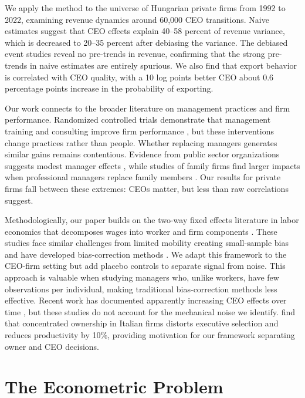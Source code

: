 \documentclass[11pt,a4paper]{article}
\begin{document}
We apply the method to the universe of Hungarian private firms from 1992 to 2022, examining revenue dynamics around 60,000 CEO transitions. Naive estimates suggest that CEO effects explain 40--58 percent of revenue variance, which is decreased to 20--35 percent after debiasing the variance. The debiased event studies reveal no pre-trends in revenue, confirming that the strong pre-trends in naive estimates are entirely spurious. We also find that export behavior is correlated with CEO quality, with a 10 log points better CEO about 0.6 percentage points increase in the probability of exporting.

Our work connects to the broader literature on management practices and firm performance. Randomized controlled trials demonstrate that management training and consulting improve firm performance \citep{bloom2013does, mckenzie2021small}, but these interventions change practices rather than people. Whether replacing managers generates similar gains remains contentious. Evidence from public sector organizations suggests modest manager effects \citep{fenizia2022managers, janke2024role}, while studies of family firms find larger impacts when professional managers replace family members \citep{bennedsen2007inside, sraer2007performance}. Our results for private firms fall between these extremes: CEOs matter, but less than raw correlations suggest.

Methodologically, our paper builds on the two-way fixed effects literature in labor economics that decomposes wages into worker and firm components \citep{Abowd1999Econometrica, Card2018JoLE}. These studies face similar challenges from limited mobility creating small-sample bias \citep{andrews2008high} and have developed bias-correction methods \citep{Bonhomme2023-dx, gaure2014correlation}. We adapt this framework to the CEO-firm setting but add placebo controls to separate signal from noise. This approach is valuable when studying managers who, unlike workers, have few observations per individual, making traditional bias-correction methods less effective. Recent work has documented apparently increasing CEO effects over time \citep{quigley2015has}, but these studies do not account for the mechanical noise we identify. \citet{lippi2014corporate} find that concentrated ownership in Italian firms distorts executive selection and reduces productivity by 10\%, providing motivation for our framework separating owner and CEO decisions.

\section{The Econometric Problem}
\end{document}
